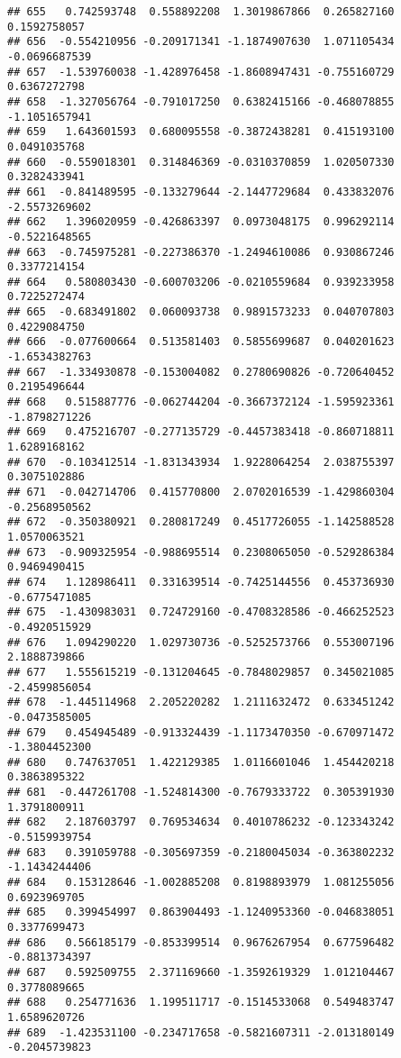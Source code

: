 \documentclass[
]{article}
\begin{document}
\begin{verbatim}
## 655   0.742593748  0.558892208  1.3019867866  0.265827160  0.1592758057
## 656  -0.554210956 -0.209171341 -1.1874907630  1.071105434 -0.0696687539
## 657  -1.539760038 -1.428976458 -1.8608947431 -0.755160729  0.6367272798
## 658  -1.327056764 -0.791017250  0.6382415166 -0.468078855 -1.1051657941
## 659   1.643601593  0.680095558 -0.3872438281  0.415193100  0.0491035768
## 660  -0.559018301  0.314846369 -0.0310370859  1.020507330  0.3282433941
## 661  -0.841489595 -0.133279644 -2.1447729684  0.433832076 -2.5573269602
## 662   1.396020959 -0.426863397  0.0973048175  0.996292114 -0.5221648565
## 663  -0.745975281 -0.227386370 -1.2494610086  0.930867246  0.3377214154
## 664   0.580803430 -0.600703206 -0.0210559684  0.939233958  0.7225272474
## 665  -0.683491802  0.060093738  0.9891573233  0.040707803  0.4229084750
## 666  -0.077600664  0.513581403  0.5855699687  0.040201623 -1.6534382763
## 667  -1.334930878 -0.153004082  0.2780690826 -0.720640452  0.2195496644
## 668   0.515887776 -0.062744204 -0.3667372124 -1.595923361 -1.8798271226
## 669   0.475216707 -0.277135729 -0.4457383418 -0.860718811  1.6289168162
## 670  -0.103412514 -1.831343934  1.9228064254  2.038755397  0.3075102886
## 671  -0.042714706  0.415770800  2.0702016539 -1.429860304 -0.2568950562
## 672  -0.350380921  0.280817249  0.4517726055 -1.142588528  1.0570063521
## 673  -0.909325954 -0.988695514  0.2308065050 -0.529286384  0.9469490415
## 674   1.128986411  0.331639514 -0.7425144556  0.453736930 -0.6775471085
## 675  -1.430983031  0.724729160 -0.4708328586 -0.466252523 -0.4920515929
## 676   1.094290220  1.029730736 -0.5252573766  0.553007196  2.1888739866
## 677   1.555615219 -0.131204645 -0.7848029857  0.345021085 -2.4599856054
## 678  -1.445114968  2.205220282  1.2111632472  0.633451242 -0.0473585005
## 679   0.454945489 -0.913324439 -1.1173470350 -0.670971472 -1.3804452300
## 680   0.747637051  1.422129385  1.0116601046  1.454420218  0.3863895322
## 681  -0.447261708 -1.524814300 -0.7679333722  0.305391930  1.3791800911
## 682   2.187603797  0.769534634  0.4010786232 -0.123343242 -0.5159939754
## 683   0.391059788 -0.305697359 -0.2180045034 -0.363802232 -1.1434244406
## 684   0.153128646 -1.002885208  0.8198893979  1.081255056  0.6923969705
## 685   0.399454997  0.863904493 -1.1240953360 -0.046838051  0.3377699473
## 686   0.566185179 -0.853399514  0.9676267954  0.677596482 -0.8813734397
## 687   0.592509755  2.371169660 -1.3592619329  1.012104467  0.3778089665
## 688   0.254771636  1.199511717 -0.1514533068  0.549483747  1.6589620726
## 689  -1.423531100 -0.234717658 -0.5821607311 -2.013180149 -0.2045739823

\end{verbatim}
\end{document}

